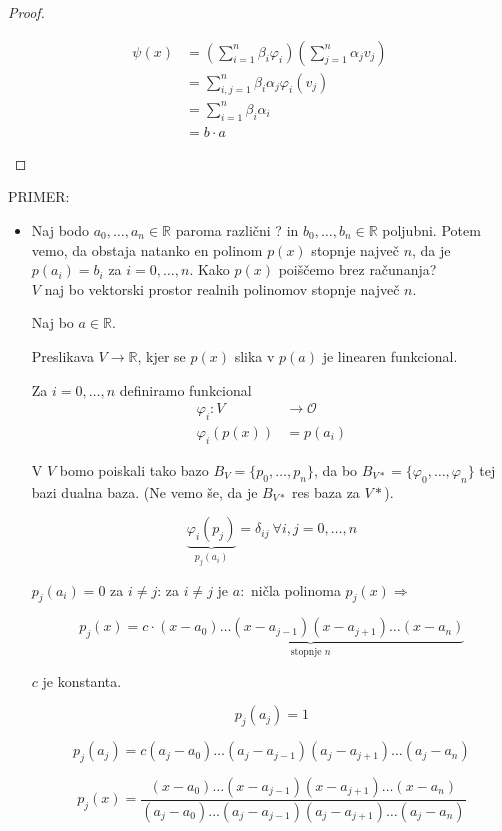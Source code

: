 \documentclass[a4paper,12pt]{article}
\newcommand{\RR}{\mathbb{R}}
\newcommand{\OO}{\mathcal{O}}
\begin{document}
\begin{proof} ~
	\begin{center}
		\begin{align*}
			\psi(x)&=(\sum_{i=1}^n\beta_i\varphi_i)(\sum_{j=1}^n\alpha_jv_j)\\
			&= \sum_{i,j=1}^n\beta_i\alpha_j \varphi_i(v_j) \\
			&= \sum_{i=1}^n\beta_i\alpha_i \\
			&=b\cdot a
		\end{align*}
	\end{center}
\end{proof}

PRIMER:
\begin{itemize}
	\item Naj bodo $a_0,\ldots,a_n\in \RR$ paroma različni ? in $b_0,\ldots,b_n\in \RR$ poljubni. Potem vemo, da obstaja natanko en polinom $p(x)$ stopnje največ $n$, da je $p(a_i)=b_i$ za $i=0,\ldots,n$. Kako $p(x)$ poiščemo brez računanja?\\
	
	$V$ naj bo vektorski prostor realnih polinomov stopnje največ $n$. 

	Naj bo $a\in \RR$. 

	Preslikava $V\to \RR$, kjer se $p(x)$ slika v $p(a)$ je linearen funkcional. 

	Za $i=0,\ldots,n$ definiramo funkcional 
	\begin{align*}
		\varphi_i: V&\to \OO \\
		\varphi_i(p(x))&=p(a_i)
	\end{align*}

	V $V$ bomo poiskali tako bazo $B_V=\{p_0,\ldots,p_n\}$, da bo $B_{V*}=\{\varphi_0,\ldots,\varphi_n\}$ tej bazi dualna baza. (Ne vemo še, da je $B_{V*}$ res baza za $V*$). 

	$$\underbrace{\varphi_i(p_j)}_{p_j(a_i)}=\delta_{ij}~\forall i,j=0,\ldots,n$$ 

	\newpage 

	$p_j(a_i)=0$ za $i\neq j$: za $i\neq j$ je $a:$ ničla polinoma $p_j(x) \Rightarrow$ 
	
	$$p_j(x)=c\cdot \underbrace{(x-a_0)\ldots(x-a_{j-1})(x-a_{j+1})\ldots(x-a_n)}_{\text{stopnje $n$}}$$ 

	$c$ je konstanta. 

$$p_j(a_j)=1$$

	$$p_j(a_j)=c(a_j-a_0)\ldots(a_j-a_{j-1})(a_j-a_{j+1})\ldots(a_j-a_n)$$

$$p_j(x)=\frac{(x-a_0)\ldots(x-a_{j-1})(x-a_{j+1})\ldots(x-a_n)}{(a_j-a_0)\ldots(a_j-a_{j-1})(a_j-a_{j+1})\ldots(a_j-a_n)}$$ \\


\end{itemize}
\end{document}
